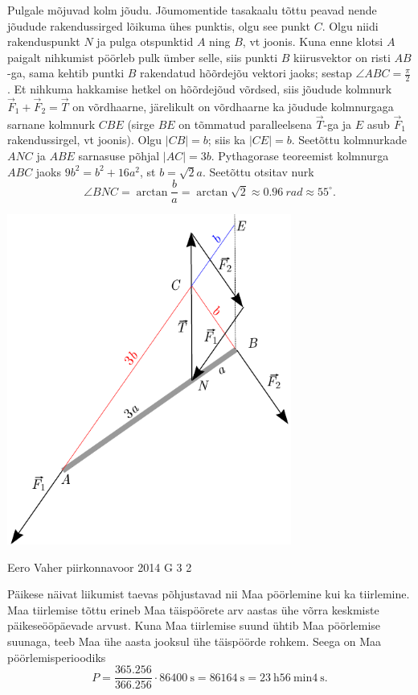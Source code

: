 \documentclass[11pt, twoside]{article}
\begin{document}
{{\ifSolution
Pulgale mõjuvad kolm jõudu. Jõumomentide tasakaalu tõttu peavad nende jõudude rakendussirged lõikuma ühes punktis, olgu see punkt $C$. Olgu niidi rakenduspunkt $N$ ja pulga otspunktid $A$ ning $B$, vt joonis. Kuna enne klotsi $A$ paigalt nihkumist pöörleb pulk ümber selle, siis punkti $B$ kiirusvektor on risti $AB$-ga, sama kehtib puntki $B$ rakendatud hõõrdejõu vektori jaoks; sestap $\angle ABC=\frac{\pi}{2}$. Et nihkuma hakkamise hetkel on hõõrdejõud võrdsed, siis jõudude kolmnurk $\vec F_1+\vec F_2=\vec T$ on võrdhaarne, järelikult on võrdhaarne ka jõudude kolmnurgaga sarnane kolmnurk $CBE$ (sirge $BE$ on tõmmatud paralleelsena $\vec T$-ga ja $E$ asub $\vec F_1$ rakendussirgel, vt joonis).
Olgu $|CB|=b$; siis ka $|CE|=b$. Seetõttu kolmnurkade $ANC$ ja $ABE$ sarnasuse põhjal $|AC|=3b$. Pythagorase
teoreemist kolmnurga $ABC$ jaoks $9b^2=b^2+16a^2$, st $b=\sqrt 2a$. Seetõttu otsitav nurk 
\[
\angle BNC=\arctan \frac ba =\arctan \sqrt 2\approx\SI{0.96}{rad}\approx 55^\circ.
\]
\begin{center}
\includegraphics[width=0.7\textwidth]{2015-v3g-09-pulk_lah}
\end{center}
\fi
}

{Eero Vaher} %
{piirkonnavoor} %
{2014} %
{G 3} %
{2} %
{

\ifSolution
Päikese näivat liikumist taevas põhjustavad nii Maa pöörlemine kui ka tiirlemine. Maa tiirlemise tõttu erineb Maa täispöörete arv aastas ühe võrra keskmiste päikeseööpäevade arvust. Kuna Maa tiirlemise suund ühtib Maa pöörlemise suunaga, teeb Maa ühe aasta jooksul ühe täispöörde rohkem. Seega on Maa pöörlemisperioodiks
\[
P=\frac{\num{365,256}}{\num{366,256}} \cdot \SI{86400}{\second}=\SI{86164}{\second}=\SI{23}{\hour} \SI{56}{\minute} \SI{4}{\second}.
\]

}}
\end{document}
